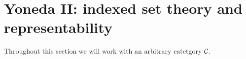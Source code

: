 



\chapter{Yoneda II: indexed set theory and representability}

Throughout this section we will work with an arbitrary catetgory \(\mathcal C\).


